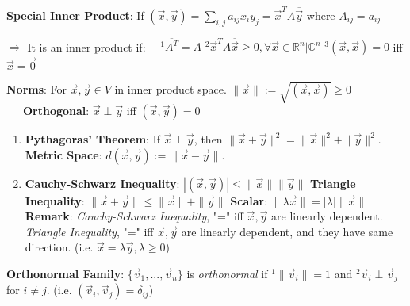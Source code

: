 \documentclass[9pt]{article}
\begin{document}
\textbf{Special Inner Product}: If $(\vec{x},\vec{y})=\sum_{i,j} a_{ij}x_i\overline{y_j}=\vec{x}^TA\overline{\vec{y}}$ \quad where $A_{ij}=a_{ij}$

\hspace{103pt} $\Rightarrow$ It is an inner product if: \ \ $^1\overline{A^T}=A$ \quad $^2\vec{x}^TA\overline{\vec{x}}\ge0,\forall \vec{x}\in\mathbb{R}^n|\mathbb{C}^n$ \quad $^3(\vec{x},\vec{x})=0$ iff $\vec{x}=\vec{0}$

\textbf{Norms}: For $\vec{x},\vec{y}\in V$ in inner product space. \quad $\|\vec{x}\|:=\sqrt{(\vec{x},\vec{x})}\geq0$ \qquad \ \ \ \textbf{Orthogonal}: $\vec{x}\perp\vec{y}$ iff $(\vec{x},\vec{y})=0$

\begin{enumerate}[itemsep=-2pt, topsep=-2pt]
    \item \textbf{Pythagoras' Theorem}: If $\vec{x}\perp\vec{y}$, then $\|\vec{x}+\vec{y}\|^2=\|\vec{x}\|^2+\|\vec{y}\|^2$. \qquad \textbf{Metric Space}: $d(\vec{x},\vec{y}):=\|\vec{x}-\vec{y}\|$.
    \item \textbf{Cauchy-Schwarz Inequality}: $|(\vec{x},\vec{y})|\leq\|\vec{x}\|\|\vec{y}\|$ \qquad \textbf{Triangle Inequality}: $\|\vec{x}+\vec{y}\|\leq\|\vec{x}\|+\|\vec{y}\|$ \qquad \textbf{Scalar}: $\|\lambda\vec{x}\|=|\lambda|\|\vec{x}\|$ \\
    \textbf{Remark}: {\scriptsize \textit{Cauchy-Schwarz Inequality}, "=" iff $\vec{x},\vec{y}$ are linearly dependent. \quad \textit{Triangle Inequality}, "=" iff $\vec{x},\vec{y}$ are linearly dependent, and they have same direction. (i.e. $\vec{x}=\lambda\vec{y},\lambda\ge0$)}
\end{enumerate}

\textbf{Orthonormal Family}: $\{\vec{v}_1,...,\vec{v}_n\}$ is \textit{orthonormal} if $^1\|\vec{v}_i\|=1$ and $^2\vec{v}_i\perp\vec{v}_j$ for $i\ne j$. {\scriptsize (i.e. $(\vec{v}_i,\vec{v}_j)=\delta_{ij}$)} 
\end{document}
